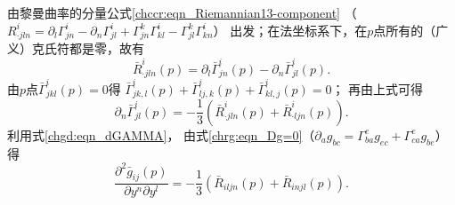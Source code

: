 由黎曼曲率的分量公式\eqref{chccr:eqn_Riemannian13-component}
（$    R_{\cdot jln}^i = {\partial_l} \Gamma_{jn}^{i} -\partial_n \Gamma_{jl}^{i}
      + \Gamma_{jn}^{k} \Gamma_{kl}^{i} - \Gamma_{jl}^{k}\Gamma_{kn}^{i} $）
出发；在法坐标系下，在$p$点所有的（广义）克氏符都是零，故有
\begin{equation}
    \bar{R}_{\cdot jln}^i(p) = {\partial_l} \bar{\Gamma}_{jn}^{i}(p) -\partial_n \bar{\Gamma}_{jl}^{i}(p) .
\end{equation}
由$p$点$\bar{\Gamma}^{i}_{jkl}(p) = 0$得
$\bar{\Gamma}^{i}_{jk,l}(p)+\bar{\Gamma}^{i}_{lj,k}(p)+\bar{\Gamma}^{i}_{kl,j}(p)=0$；
再由上式可得
\begin{equation}\label{chgd:eqn_dGAMMA}
    \partial_n \bar{\Gamma}_{jl}^{i}(p) = -\frac{1}{3}\left(
      \bar{R}_{\cdot jln}^i(p)+\bar{R}_{\cdot ljn}^i(p) \right).
\end{equation}
利用式\eqref{chgd:eqn_dGAMMA}，
由式\eqref{chrg:eqn_Dg=0}（$\partial_a g_{bc} = \Gamma_{ba}^e g_{ec} + \Gamma_{ca}^e g_{be}$）得
\begin{equation}\label{chgd:eqn_gijkl=R}
    \frac{\partial^2 \bar{g}_{ij}(p)}{\partial y^n\partial y^l}
    = -\frac{1}{3}\left(\bar{R}_{iljn}(p)+\bar{R}_{injl}(p) \right).
\end{equation}

